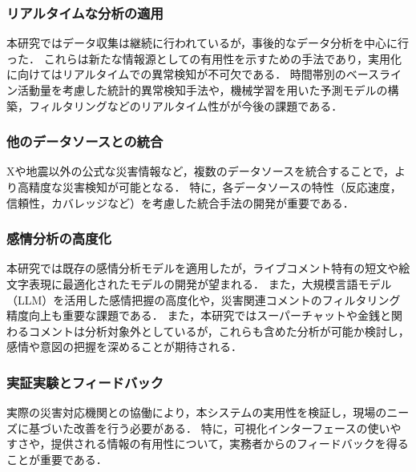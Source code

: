 \subsubsection{リアルタイムな分析の適用}

本研究ではデータ収集は継続に行われているが，事後的なデータ分析を中心に行った．
これらは新たな情報源としての有用性を示すための手法であり，実用化に向けてはリアルタイムでの異常検知が不可欠である．
時間帯別のベースライン活動量を考慮した統計的異常検知手法や，機械学習を用いた予測モデルの構築，フィルタリングなどのリアルタイム性がが今後の課題である．

\subsubsection{他のデータソースとの統合}

Xや地震以外の公式な災害情報など，複数のデータソースを統合することで，より高精度な災害検知が可能となる．
特に，各データソースの特性（反応速度，信頼性，カバレッジなど）を考慮した統合手法の開発が重要である．

\subsubsection{感情分析の高度化}

本研究では既存の感情分析モデルを適用したが，ライブコメント特有の短文や絵文字表現に最適化されたモデルの開発が望まれる．
また，大規模言語モデル（LLM）を活用した感情把握の高度化や，災害関連コメントのフィルタリング精度向上も重要な課題である．
また，本研究ではスーパーチャットや金銭と関わるコメントは分析対象外としているが，これらも含めた分析が可能か検討し，感情や意図の把握を深めることが期待される．

\subsubsection{実証実験とフィードバック}

実際の災害対応機関との協働により，本システムの実用性を検証し，現場のニーズに基づいた改善を行う必要がある．
特に，可視化インターフェースの使いやすさや，提供される情報の有用性について，実務者からのフィードバックを得ることが重要である．


